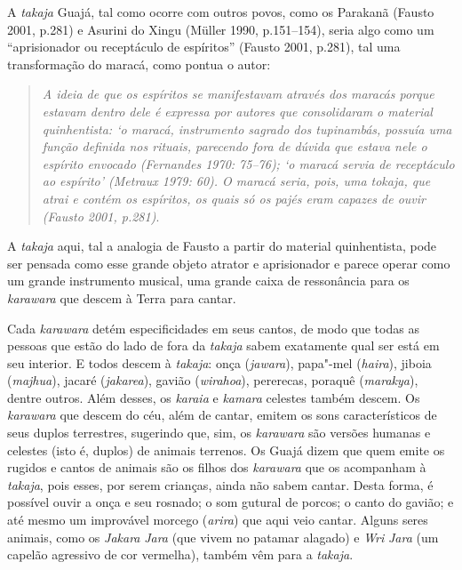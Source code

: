 A \emph{takaja} Guajá, tal como ocorre com outros povos, como os
Parakanã (Fausto 2001, p.281) e Asurini do Xingu (Müller 1990,
p.151--154), seria algo como um ``aprisionador ou receptáculo de
espíritos'' (Fausto 2001, p.281), tal uma transformação do maracá, como
pontua o autor:

\begin{quote}
\emph{A ideia de que os espíritos se manifestavam através dos maracás porque
estavam dentro dele é expressa por autores que consolidaram o material
quinhentista: `o maracá, instrumento sagrado dos tupinambás, possuía uma
função definida nos rituais, parecendo fora de dúvida que estava nele o
espírito envocado (Fernandes 1970: 75--76); `o maracá servia de
receptáculo ao espírito' (Metraux 1979: 60). O maracá seria, pois, uma
tokaja, que atrai e contém os espíritos, os quais só os pajés eram
capazes de ouvir (Fausto 2001, p.281)}.
\end{quote}

A \emph{takaja} aqui, tal a analogia de Fausto a partir do material
quinhentista, pode ser pensada como esse grande objeto atrator e
aprisionador e parece operar como um grande instrumento musical, uma
grande caixa de ressonância para os \emph{karawara} que descem à Terra
para cantar.

Cada \emph{karawara} detém especificidades em seus cantos, de modo que
todas as pessoas que estão do lado de fora da \emph{takaja} sabem
exatamente qual ser está em seu interior. E todos descem à
\emph{takaja}: onça (\emph{jawara}), papa"-mel (\emph{haira}), jiboia
(\emph{majhua}), jacaré (\emph{jakarea}), gavião (\emph{wirahoa}),
pererecas, poraquê (\emph{marakya}), dentre outros. Além desses, os
\emph{karaia} e \emph{kamara} celestes também descem. Os \emph{karawara}
que descem do céu, além de cantar, emitem os sons característicos de
seus duplos terrestres, sugerindo que, sim, os \emph{karawara} são
versões humanas e celestes (isto é, duplos) de animais terrenos. Os
Guajá dizem que quem emite os rugidos e cantos de animais são os filhos
dos \emph{karawara} que os acompanham à \emph{takaja}, pois esses, por
serem crianças, ainda não sabem cantar. Desta forma, é possível ouvir a
onça e seu rosnado; o som gutural de porcos; o canto do gavião; e até
mesmo um improvável morcego (\emph{arira}) que aqui veio cantar. Alguns
seres animais, como os \emph{Jakara} \emph{Jara} (que vivem no patamar
alagado) e \emph{Wri} \emph{Jara} (um capelão agressivo de cor
vermelha), também vêm para a \emph{takaja}.

